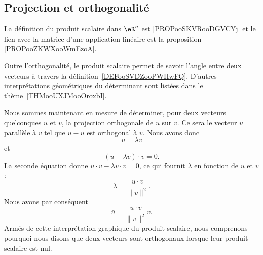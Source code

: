 \subsection{Projection et orthogonalité}

La définition du produit scalaire dans \( \eR^n\) est \ref{PROPooSKVRooDGVCYj} et le lien avec la matrice d'une application linéaire est la proposition \ref{PROPooZKWXooWmEzoA}.

\begin{remark}
    Outre l'orthogonalité, le produit scalaire permet de savoir l'angle entre deux vecteurs à travers la définition~\ref{DEFooSVDZooPWHwFQ}. D'autres interprétations géométriques du déterminant sont listées dans le thème~\ref{THMooUXJMooOroxbI}.
\end{remark}

Nous sommes maintenant en mesure de déterminer, pour deux vecteurs quelconques $u$ et $v$, la projection orthogonale de $u$ sur $v$. Ce sera le vecteur $\bar u$ parallèle à $v$ tel que $u-\bar u$ est orthogonal à $v$. Nous avons donc
\begin{equation}
    \bar u=\lambda v
\end{equation}
et
\begin{equation}
    (u-\lambda v)\cdot v=0.
\end{equation}
La seconde équation donne $u\cdot v-\lambda v\cdot v=0$, ce qui fournit $\lambda$ en fonction de $u$ et $v$ :
\begin{equation}
    \lambda=\frac{ u\cdot v }{ \| v \|^2 }.
\end{equation}
Nous avons par conséquent
\begin{equation}
    \bar u=\frac{ u\cdot v }{ \| v \|^2 }v.
\end{equation}
Armés de cette interprétation graphique du produit scalaire, nous comprenons pourquoi nous disons que deux vecteurs sont orthogonaux lorsque leur produit scalaire est nul.

